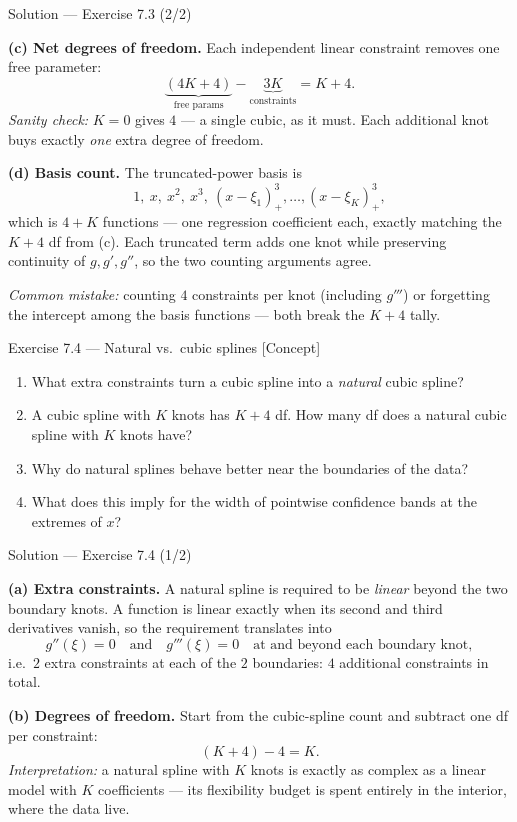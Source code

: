 \documentclass[aspectratio=169,11pt]{beamer}
\begin{document}
\begin{frame}{Solution --- Exercise 7.3 (2/2)}
\begin{solutionbox}
\textbf{(c) Net degrees of freedom.} Each independent linear constraint removes one free parameter:
\[ \underbrace{(4K+4)}_{\text{free params}}-\underbrace{3K}_{\text{constraints}} = K+4. \]
\emph{Sanity check:} $K=0$ gives $4$ --- a single cubic, as it must. Each additional knot buys exactly \emph{one} extra degree of freedom.

\medskip
\textbf{(d) Basis count.} The truncated-power basis is
\[ 1,\ x,\ x^2,\ x^3,\ (x-\xi_1)^3_+,\dots,(x-\xi_K)^3_+, \]
which is $4+K$ functions --- one regression coefficient each, exactly matching the $K+4$ df from (c). Each truncated term adds one knot while preserving continuity of $g,g',g''$, so the two counting arguments agree.

\medskip
\textit{Common mistake:} counting $4$ constraints per knot (including $g'''$) or forgetting the intercept among the basis functions --- both break the $K+4$ tally.
\end{solutionbox}
\end{frame}

\begin{frame}{Exercise 7.4 --- Natural vs.\ cubic splines [Concept]}
\begin{exercise}
\begin{enumerate}
  \item What extra constraints turn a cubic spline into a \emph{natural} cubic spline?
  \item A cubic spline with $K$ knots has $K+4$ df. How many df does a natural cubic spline with $K$ knots have?
  \item Why do natural splines behave better near the boundaries of the data?
  \item What does this imply for the width of pointwise confidence bands at the extremes of $x$?
\end{enumerate}
\end{exercise}
\end{frame}

\begin{frame}{Solution --- Exercise 7.4 (1/2)}
\begin{solutionbox}
\textbf{(a) Extra constraints.} A natural spline is required to be \emph{linear} beyond the two boundary knots. A function is linear exactly when its second and third derivatives vanish, so the requirement translates into
\[ g''(\xi)=0 \quad\text{and}\quad g'''(\xi)=0 \quad \text{at and beyond each boundary knot}, \]
i.e.\ $2$ extra constraints at each of the $2$ boundaries: $4$ additional constraints in total.

\medskip
\textbf{(b) Degrees of freedom.} Start from the cubic-spline count and subtract one df per constraint:
\[ (K+4)-4 = K. \]
\emph{Interpretation:} a natural spline with $K$ knots is exactly as complex as a linear model with $K$ coefficients --- its flexibility budget is spent entirely in the interior, where the data live.
\end{solutionbox}
\end{frame}
\end{document}
